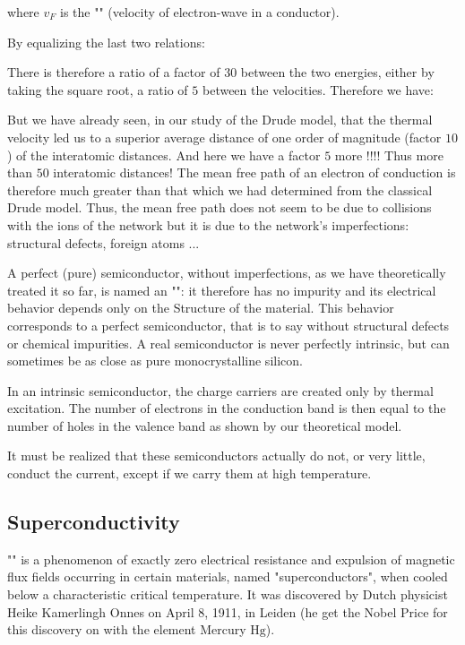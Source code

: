 	where $v_F$ is the "" (velocity of electron-wave in a conductor).
	
	By equalizing the last two relations:
	
	There is therefore a ratio of a factor of $30$ between the two energies, either by taking the square root, a ratio of $5$ between the velocities. Therefore we have:
	
	 But we have already seen, in our study of the Drude model, that the thermal velocity led us to a superior average distance of one order of magnitude (factor $10$) of the interatomic distances. And here we have a factor $5$ more !!!! Thus more than $50$ interatomic distances! The mean free path of an electron of conduction is therefore much greater than that which we had determined from the classical Drude model. Thus, the mean free path does not seem to be due to collisions with the ions of the network but it is due to the network's imperfections: structural defects, foreign atoms ...

	A perfect (pure) semiconductor, without imperfections, as we have theoretically treated it so far, is named an "": it therefore has no impurity and its electrical behavior depends only on the Structure of the material. This behavior corresponds to a perfect semiconductor, that is to say without structural defects or chemical impurities. A real semiconductor is never perfectly intrinsic, but can sometimes be as close as pure monocrystalline silicon.

	In an intrinsic semiconductor, the charge carriers are created only by thermal excitation. The number of electrons in the conduction band is then equal to the number of holes in the valence band as shown by our theoretical model.

	It must be realized that these semiconductors actually do not, or very little, conduct the current, except if we carry them at high temperature.
	
	
	\pagebreak
	\subsection{Superconductivity}\label{superconductivity}
	"" is a phenomenon of exactly zero electrical resistance and expulsion of magnetic flux fields occurring in certain materials, named "superconductors", when cooled below a characteristic critical temperature. It was discovered by Dutch physicist Heike Kamerlingh Onnes on April 8, 1911, in Leiden (he get the Nobel Price for this discovery on with the element Mercury $\mathrm{Hg}$). 
	
